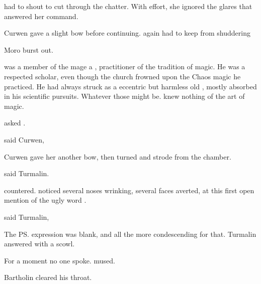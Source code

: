 \begin{garbage}
 \Tiroco{} had to shout to cut through the chatter. 
With effort, she ignored the glares that answered her command. 

Curwen gave a slight bow before continuing. 
%
\dash again \Tiroco{} had to keep from shuddering\dash%

 Moro \Cornel{} burst out. 

\Onatol{} was a member of the mage \ishrah{}\dash a \rethyax, practitioner of the \Ortaican{} tradition of magic. 
He was a respected scholar, even though the church frowned upon the Chaos magic he practiced. 
He had always struck \Tiroco{} as a eccentric but harmless old \dax, mostly absorbed in his scientific pursuits. 
Whatever those might be. 
\Tiroco{} knew nothing of the art of magic. 

 asked \Tiroco. 

 said Curwen, 


Curwen gave her another bow, then turned and strode from the chamber. 

 said Turmalin. 

 \Mater{} \Vincerre{} countered. 
\Tiroco{} noticed several noses wrinking, several faces averted, at this first open mention of the ugly word . 

 said Turmalin, 

 The \ps{\mater} expression was blank, and all the more condescending for that. Turmalin answered with a scowl. 

For a moment no one spoke. 
 \Tiroco{} mused. 

Bartholin cleared his throat. 


\end{garbage}
